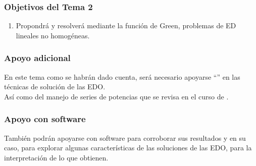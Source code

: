 \documentclass[12pt]{beamer}
\begin{document}
\begin{frame}
\frametitle{Objetivos del Tema 2}
\begin{enumerate}[<+->]
\conti
\item Propondrá y resolverá mediante la función de Green, problemas de ED lineales no homogéneas.
\end{enumerate}
\end{frame}
\begin{frame}
\frametitle{Apoyo adicional}
En este tema como se habrán dado cuenta, será necesario apoyarse \enquote{} en las técnicas de solución de las EDO.
\\
\bigskip
\pause
Así como del manejo de series de potencias que se revisa en el curso de .
\end{frame}
\begin{frame}
\frametitle{Apoyo con software}
También podrán apoyarse con software para corroborar sus resultados y en su caso, para explorar algunas características de las soluciones de las EDO, para la interpretación de lo que obtienen.
\end{frame}

\end{document}
